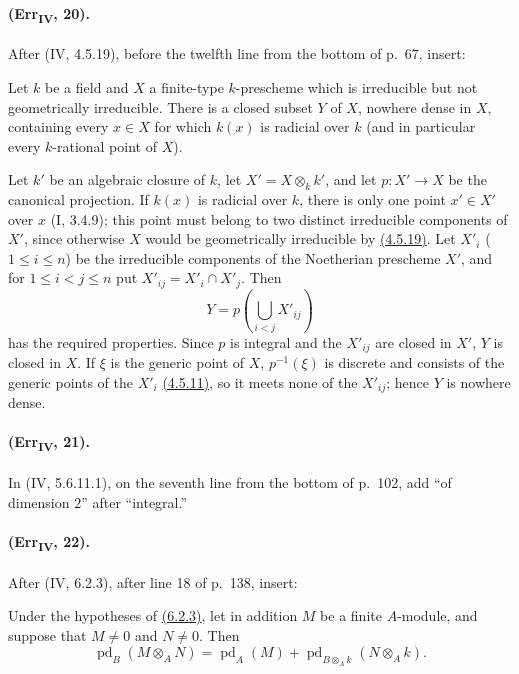 \paragraph{(Err\textsubscript{IV}, 20).}
After (IV, 4.5.19), before the twelfth line from the bottom of p.~67,
insert:

\begin{corollary}[4.5.19.3]
\label{IV.4.5.19.3}
Let $k$ be a field and $X$ a finite-type $k$-prescheme which is
irreducible but not geometrically irreducible.  There is a closed subset
$Y$ of $X$, nowhere dense in $X$, containing every $x\in X$ for which
$k(x)$ is radicial over $k$ (and in particular every $k$-rational point
of $X$).
\end{corollary}

Let $k'$ be an algebraic closure of $k$, let $X'=X\otimes_kk'$, and let
$p:X'\to X$ be the canonical projection.  If $k(x)$ is radicial over
$k$, there is only one point $x'\in X'$ over $x$ (I, 3.4.9); this point
must belong to two distinct irreducible components of $X'$, since
otherwise $X$ would be geometrically irreducible by {\hyperlink{ega4.c04.prop.4-5-19}{(4.5.19)}}.  Let
$X'_i$ ($1\leq i\leq n$) be the irreducible components of the Noetherian
prescheme $X'$, and for $1\leq i<j\leq n$ put
$X'_{ij}=X'_i\cap X'_j$.  Then
\[
 Y=p\left(\bigcup_{i<j}X'_{ij}\right)
\]
has the required properties.  Since $p$ is integral and the $X'_{ij}$
are closed in $X'$, $Y$ is closed in $X$.  If $\xi$ is the generic point
of $X$, $p^{-1}(\xi)$ is discrete and consists of the generic points of
the $X'_i$ {\hyperlink{ega4.c04.cor.4-5-11}{(4.5.11)}}, so it meets none of the $X'_{ij}$; hence $Y$ is
nowhere dense.

\paragraph{(Err\textsubscript{IV}, 21).}
In (IV, 5.6.11.1), on the seventh line from the bottom of p.~102, add
``of dimension $2$'' after ``integral.''

\paragraph{(Err\textsubscript{IV}, 22).}
After (IV, 6.2.3), after line 18 of p.~138, insert:

\begin{proposition}[6.2.4]
\label{IV.6.2.4}
Under the hypotheses of {\hyperlink{ega4.c04.prop.6-2-3}{(6.2.3)}}, let in addition $M$ be a finite
$A$-module, and suppose that $M\neq0$ and $N\neq0$.  Then
\begin{equation}
 \operatorname{pd}_B(M\otimes_AN)=
 \operatorname{pd}_A(M)+
 \operatorname{pd}_{B\otimes_Ak}(N\otimes_Ak). \label{IV.6.2.4.1}
\tag{6.2.4.1}
\end{equation}
\end{proposition}

